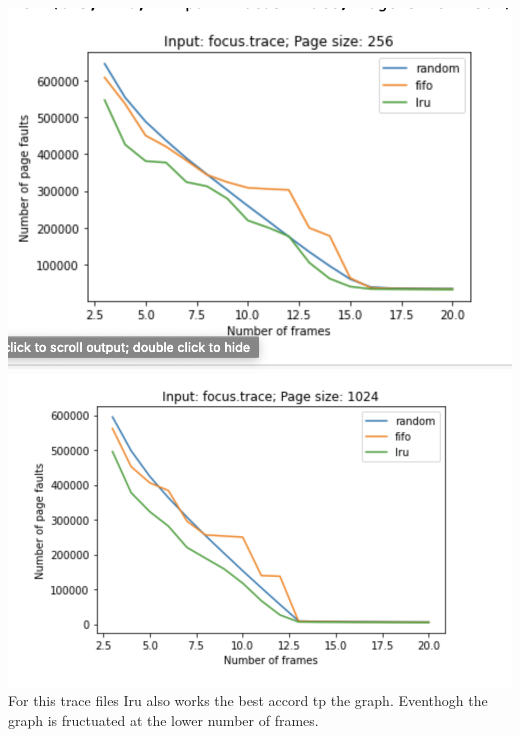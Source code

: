 \documentclass[a4paper, 11pt]{article}
\begin{document}
\begin{enumerate}
	\includegraphics[width=\textwidth]{focusTrace256.png}\\
	\includegraphics[width=\textwidth]{focusTrace1024.png}\\
	For this trace files Iru also works the best accord tp the graph. Eventhogh the graph is fructuated at the lower number of frames. 
\end{enumerate}
\end{document}
